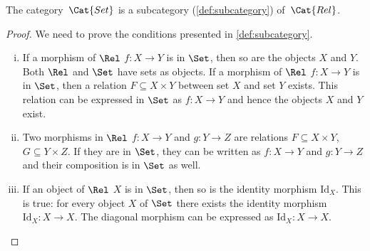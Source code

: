 \begin{lemma}
    The category~$\Cat{Set}$ is a subcategory (\cref{def:subcategory}) of~$\Cat{Rel}$.
\end{lemma}
\begin{proof}
	We need to prove the conditions presented in \cref{def:subcategory}.
	\begin{enumerate}[(i)]
	\item If a morphism of $\Rel$ $f \colon X\to Y$ is in $\Set$, then so are the objects $X$ and $Y$. Both $\Rel$ and $\Set$ have sets as objects. If a morphism of $\Rel$ $f\colon X\to Y$ is in $\Set$, then a relation $F\subseteq X\times Y$ between set $X$ and set $Y$ exists. This relation can be expressed in $\Set$ as $f\colon X\to Y$ and hence the objects $X$ and $Y$ exist.
	\item Two morphisms in $\Rel$ $f\colon X\to Y$ and $g\colon Y\to Z$ are relations $F\subseteq X\times Y$, $G\subseteq Y\times Z$. If they are in $\Set$, they can be written as $f\colon X\to Y$ and $g\colon Y\to Z$ and their composition is in $\Set$ as well. 
	\item If an object of $\Rel$ $X$ is in $\Set$, then so is the identity morphism $\text{Id}_X$. This is true: for every object $X$ of $\Set$ there exists the identity morphism $\text{Id}_X:X\to X$. The diagonal morphism can be expressed as $\text{Id}_X:X\to X$.
	\end{enumerate}
\end{proof}
